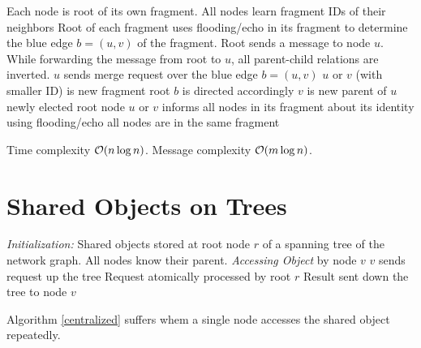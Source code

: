 \documentclass[11pt, oneside]{book}   						%
\begin{document}
\begin{algorithm}
\caption{}\label{ghs}
\begin{algorithmic}[1]
\State Each node is root of its own fragment.
\Repeat
	\State All nodes learn fragment IDs of their neighbors
	\State Root of each fragment uses flooding/echo in its fragment to determine the blue edge $b=(u,v)$ of the fragment.
	\State Root sends a message to node $u$. While forwarding the message from root to $u$, all parent-child relations are inverted.
	\State $u$ sends merge request over the blue edge $b=(u,v)$ 
		\State $u$ or $v$ (with smaller ID) is new fragment root
		\State $b$ is directed accordingly
	\Else
		\State $v$ is new parent of $u$
	\EndIf
	\State newly elected root node $u$ or $v$ informs all nodes in its fragment about its identity using flooding/echo
\Until all nodes are in the same fragment
\end{algorithmic}
\end{algorithm}
\begin{mythm} Time complexity $\mathcal{O}(n\log n)$. Message complexity $\mathcal{O}(m\log n)$.\end{mythm}

\section{Shared Objects on Trees}
\textbf{}
\begin{algorithm}
\caption{}\label{centralized}
\begin{algorithmic}[1]
\Statex\textit{Initialization: }{Shared objects stored at root node $r$ of a spanning tree of the network graph. All nodes know their parent.}
\Statex
\Statex\textit{Accessing Object} {by node $v$}
	\State $v$ sends request up the tree
	\State Request atomically processed by root $r$
	\State Result sent down the tree to node $v$
\end{algorithmic}
\end{algorithm}
\begin{myremark}Algorithm \ref{centralized} suffers whem a single node accesses the shared object repeatedly.
\end{myremark}
\end{document}
